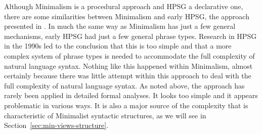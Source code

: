 \documentclass[output=paper,biblatex,babelshorthands,newtxmath,draftmode,colorlinks,citecolor=brown]{langscibook}
\begin{document}
Although Minimalism is a procedural approach and HPSG a declarative one, there are some
similarities between Minimalism and early HPSG, the approach presented in \citet{ps,ps2}. In much
the same way as Minimalism has just a few general mechanisms, early HPSG had just a few general
phrase types. Research in HPSG in the 1990s led to the conclusion that this is too simple and that a
more complex system of phrase types is needed to accommodate the full complexity of natural language
syntax. Nothing like this happened within Minimalism, almost certainly because there was little
attempt within this approach to deal with the full complexity of natural language syntax. As noted
above, the approach has rarely been applied in detailed formal analyses. It looks too simple and it
appears problematic in various ways. It is also a major source of the complexity that is
characteristic of Minimalist syntactic structures, as we will see in Section~\ref{sec:min-views-structure}. 

\end{document}
